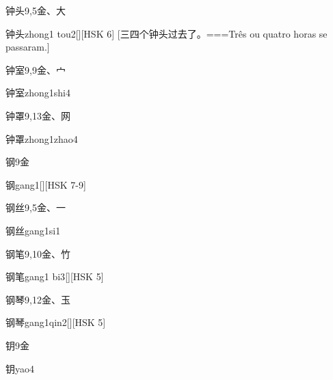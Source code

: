 \begin{Entry}{钟头}{9,5}{⾦、⼤}
  \begin{Phonetics}{钟头}{zhong1 tou2}[][HSK 6]
    [三四个钟头过去了。===Três ou quatro horas se passaram.]
  \end{Phonetics}
\end{Entry}

\begin{Entry}{钟室}{9,9}{⾦、⼧}
  \begin{Phonetics}{钟室}{zhong1shi4}
  \end{Phonetics}
\end{Entry}

\begin{Entry}{钟罩}{9,13}{⾦、⽹}
  \begin{Phonetics}{钟罩}{zhong1zhao4}
  \end{Phonetics}
\end{Entry}

\begin{Entry}{钢}{9}{⾦}
  \begin{Phonetics}{钢}{gang1}[][HSK 7-9]
  \end{Phonetics}
\end{Entry}

\begin{Entry}{钢丝}{9,5}{⾦、⼀}
  \begin{Phonetics}{钢丝}{gang1si1}
  \end{Phonetics}
\end{Entry}

\begin{Entry}{钢笔}{9,10}{⾦、⽵}
  \begin{Phonetics}{钢笔}{gang1 bi3}[][HSK 5]
  \end{Phonetics}
\end{Entry}

\begin{Entry}{钢琴}{9,12}{⾦、⽟}
  \begin{Phonetics}{钢琴}{gang1qin2}[][HSK 5]
  \end{Phonetics}
\end{Entry}

\begin{Entry}{钥}{9}{⾦}
  \begin{Phonetics}{钥}{yao4}
  \end{Phonetics}
\end{Entry}

